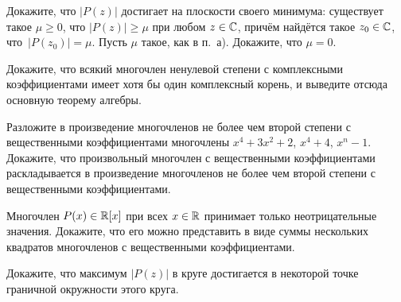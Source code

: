 \documentclass[a4paper,12pt]{article}
\begin{document}
Докажите, что $|P(z)|$ достигает на плоскости своего минимума: существует такое $\mu\ge0$, что $|P(z)|\ge\mu$ при любом $z\in\mathbb{C}$, причём найдётся такое $z_0\in\mathbb{C}$, что~$|P(z_0)|=\mu$.
 Пусть $\mu$ такое, как в п.~а). Докажите, что $\mu=0$.

Докажите, что  всякий многочлен ненулевой степени с комплексными коэффициентами имеет хотя бы один комплексный корень, и выведите отсюда основную теорему алгебры.

Разложите в произведение многочленов не более чем второй степени с вещественными коэффициентами многочлены $x^4+3x^2+2$, $x^4+4$, $x^n-1$.
Докажите, что произвольный многочлен  с вещественными коэффициентами раскладывается в произведение многочленов не более чем второй степени с вещественными коэффициентами.

Многочлен $P(x)\in\mathbb{R}[x]$ при всех $x\in\mathbb{R}$ принимает только неотрицательные значения. Докажите, что его можно представить в виде суммы нескольких квадратов многочленов с вещественными коэффициентами.

Докажите, что максимум $|P(z)|$ в круге достигается в некоторой точке граничной окружности этого круга.

\end{document}
